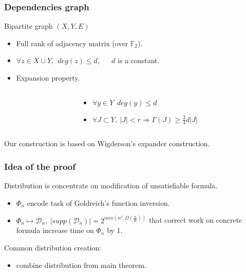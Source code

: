 \begin{frame}
    \frametitle{Dependencies graph}

    Bipartite graph $(X, Y, E)$
    \pause
    \begin{itemize}
	    \item Full rank of adjacency matrix (over $\mathbb{F}_2$).
    	\pause
        \item $\forall z \in X \cup Y, ~~ deg(z) \le d$, ~~ $d$ is a constant.
    	\pause
        \item Expansion property.
    \end{itemize}

    \pause

    \begin{columns}
        \begin{column}{5cm}
            
        \end{column}

        \pause
        \pause
        \pause
        \begin{column}{5cm}
            \begin{itemize}
                \item $\forall y \in Y ~~ deg(y) \le d$
            	\pause
	            \item $\forall J \subset Y, ~
            		|J| < r \Rightarrow \Gamma(J) \ge \frac{3}{4}d|J|$
            \end{itemize}
		\end{column}
    \end{columns}

    \pause
    Our construction is based on Wigderson's expander construction.
\end{frame}

\begin{frame}
	\frametitle{Idea of the proof}

    \pause
    Distribution is concentrate on modification of unsatisfiable formula.
	\pause
    \begin{itemize}
        \item $\Phi_n$ encode task of Goldreich's function inversion.
    	\pause
    	\item $\Phi_n \mapsto \mathcal{D}_n, ~ |supp(\mathcal{D}_n)| =
		    2^{min(n^\delta, \Omega(\frac{n}{K}))}$ that correct work
            on concrete formula increase time on $\Phi_n$ by 1.
	\end{itemize}

    \pause
    Common distribution creation:
    
    \pause
    \begin{itemize}
        \item combine distribution from main theorem.
    \end{itemize}
\end{frame}